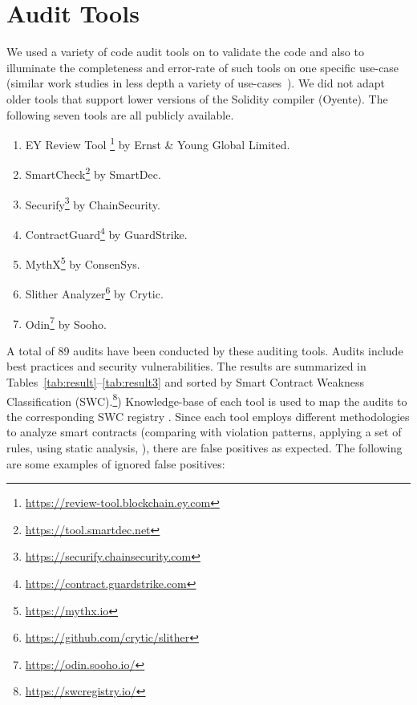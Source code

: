 
\section{Audit Tools}\label{section:ver}








We used a variety of code audit tools on \sys to validate the code and also to illuminate the completeness and error-rate of such tools on one specific use-case (similar work studies in less depth a variety of use-cases~\cite{AuditTools}). We did not adapt older tools that support lower versions of the Solidity compiler (\eg Oyente). The following seven tools are all publicly available.

\begin{enumerate}
	\item EY Review Tool \footnote{\url{https://review-tool.blockchain.ey.com}} by Ernst \& Young Global Limited.
	\item SmartCheck\footnote{\url{https://tool.smartdec.net}} by SmartDec.
	\item Securify\footnote{\url{https://securify.chainsecurity.com}} by ChainSecurity.
	\item ContractGuard\footnote{\url{https://contract.guardstrike.com}} by GuardStrike.
	\item MythX\footnote{\url{https://mythx.io}} by ConsenSys.
	\item Slither Analyzer\footnote{\url{https://github.com/crytic/slither}} by Crytic.
	\item Odin\footnote{\url{https://odin.sooho.io/}} by Sooho.
\end{enumerate}

 A total of 89 audits have been conducted by these auditing tools. Audits include best practices and security vulnerabilities. The results are summarized in Tables~\ref{tab:result}--\ref{tab:result3} and sorted by Smart Contract Weakness Classification (SWC).\footnote{\url{https://swcregistry.io/}}) Knowledge-base of each tool is used to map the audits to the corresponding SWC registry \cite{SECURIFYGIT,SMARTCHECK,MythX,ContractGuard,SlitherDoc}. Since each tool employs different methodologies to analyze smart contracts (\eg comparing with violation patterns, applying a set of rules, using static analysis, \etc), there are false positives as expected. The following are some examples of ignored false positives:
 
